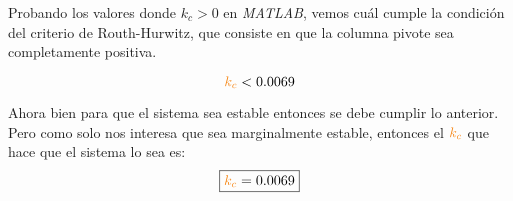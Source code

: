 Probando los valores donde \( k_c > 0 \) en \textit{MATLAB}, vemos cuál cumple la condición del criterio de Routh-Hurwitz, que consiste en que la columna pivote sea completamente positiva.

\begin{equation}
    \nara{k_{c}}  < 0.0069
\end{equation}

Ahora bien para que el sistema sea estable entonces se debe cumplir lo anterior. Pero 
como solo nos interesa que sea marginalmente estable, entonces el $\nara{k_{c}}$
que hace que el sistema lo sea es:
\begin{equation}
    \boxed{\nara{k_c} = 0.0069}
\end{equation}

